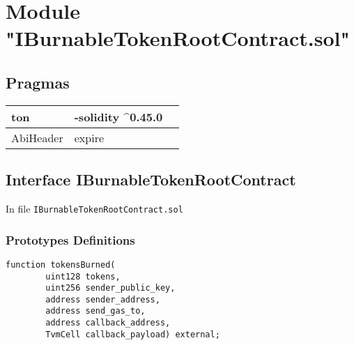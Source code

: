
\section{Module "IBurnableTokenRootContract.sol"}


\subsection{Pragmas}


\noindent\begin{tabular}{|l|l|p{5cm}|}\hline
ton & -solidity \^{}0.45.0 &\\\hline
AbiHeader &  expire &\\\hline
\end{tabular}


\subsection{Interface IBurnableTokenRootContract}


In file {\tt IBurnableTokenRootContract.sol}

\subsubsection{Prototypes Definitions}

\vspace{2cm}

\begin{lstlisting}[firstnumber=5]
    function tokensBurned(
        uint128 tokens,
        uint256 sender_public_key,
        address sender_address,
        address send_gas_to,
        address callback_address,
        TvmCell callback_payload) external;
\end{lstlisting}
